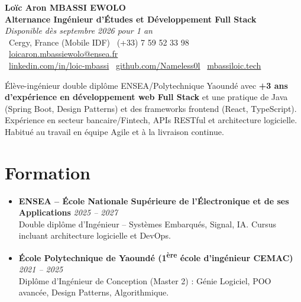 \documentclass[a4paper,11pt]{article}
\begin{document}
\begin{center}
    {\Large \textbf{Loïc Aron MBASSI EWOLO}} \\ \vspace{4pt}
    \textbf{\large Alternance Ingénieur d'Études et Développement Full Stack} \\
    \textit{\small Disponible dès septembre 2026 pour 1 an} \\ \vspace{4pt}
    \small
    \faMapMarker\ Cergy, France (Mobile IDF) \quad
    \faPhone\ (+33) 7 59 52 33 98 \quad
    \faEnvelope\ \href{mailto:loicaron.mbassiewolo@ensea.fr}{loicaron.mbassiewolo@ensea.fr} \\ \vspace{2pt}
    \faLinkedin\ \href{https://www.linkedin.com/in/loic-mbassi/}{linkedin.com/in/loic-mbassi} \quad
    \faGithub\ \href{https://github.com/Nameless0l}{github.com/Nameless0l} \quad
    \faGlobe\ \href{https://mbassiloic.tech}{mbassiloic.tech}
\end{center}

\vspace{-6pt}

\noindent\small{Élève-ingénieur double diplôme ENSEA/Polytechnique Yaoundé avec \textbf{+3 ans d'expérience en développement web Full Stack} et une pratique de Java (Spring Boot, Design Patterns) et des frameworks frontend (React, TypeScript). Expérience en secteur bancaire/Fintech, APIs RESTful et architecture logicielle. Habitué au travail en équipe Agile et à la livraison continue.}

\section{Formation}
\begin{itemize}[leftmargin=*, label=\tiny$\bullet$, nosep]
    \item \textbf{ENSEA -- École Nationale Supérieure de l'Électronique et de ses Applications} \hfill \textit{2025 -- 2027} \\
    \small{Double diplôme d'Ingénieur -- Systèmes Embarqués, Signal, IA. Cursus incluant architecture logicielle et DevOps.}
    \item \textbf{École Polytechnique de Yaoundé (1\textsuperscript{ère} école d'ingénieur CEMAC)} \hfill \textit{2021 -- 2025} \\
    \small{Diplôme d'Ingénieur de Conception (Master 2) : Génie Logiciel, POO avancée, Design Patterns, Algorithmique.}
\end{itemize}
\end{document}

